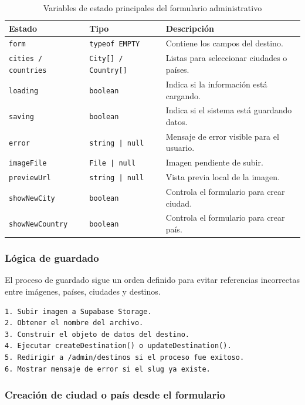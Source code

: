 \documentclass[12pt,letterpaper]{article}
\newcommand{\code}[1]{\nolinkurl{#1}}
\begin{document}
\begin{longtable}{|p{}|p{}|p{}|}
\caption{Variables de estado principales del formulario administrativo}\\
\hline
\textbf{Estado} & \textbf{Tipo} & \textbf{Descripción} \\
\hline
\code{form} & \code{typeof EMPTY} & Contiene los campos del destino. \\
\hline
\code{cities / countries} & \code{City[] / Country[]} & Listas para seleccionar ciudades o países. \\
\hline
\code{loading} & \code{boolean} & Indica si la información está cargando. \\
\hline
\code{saving} & \code{boolean} & Indica si el sistema está guardando datos. \\
\hline
\code{error} & \code{string | null} & Mensaje de error visible para el usuario. \\
\hline
\code{imageFile} & \code{File | null} & Imagen pendiente de subir. \\
\hline
\code{previewUrl} & \code{string | null} & Vista previa local de la imagen. \\
\hline
\code{showNewCity} & \code{boolean} & Controla el formulario para crear ciudad. \\
\hline
\code{showNewCountry} & \code{boolean} & Controla el formulario para crear país. \\
\hline
\end{longtable}

\subsubsection*{Lógica de guardado}

El proceso de guardado sigue un orden definido para evitar referencias incorrectas entre imágenes, países, ciudades y destinos.

\begin{lstlisting}[language={}]
1. Subir imagen a Supabase Storage.
2. Obtener el nombre del archivo.
3. Construir el objeto de datos del destino.
4. Ejecutar createDestination() o updateDestination().
5. Redirigir a /admin/destinos si el proceso fue exitoso.
6. Mostrar mensaje de error si el slug ya existe.
\end{lstlisting}

\subsubsection*{Creación de ciudad o país desde el formulario}
\end{document}
